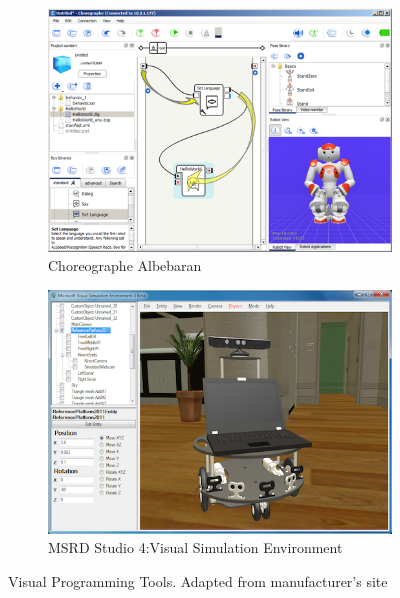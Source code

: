 {\begin{figure}[H]
\centering
\begin{subfigure}[b]{0.5\textwidth}
\includegraphics[width=\textwidth]{assets/helloworld_cho_dlg_05.png}
\caption{Choreographe Albebaran}
\label{fig:choreographe}
\end{subfigure}%
\begin{subfigure}[b]{0.5\textwidth}
\includegraphics[width=\textwidth]{assets/MSRD4_VSE2.png}
\caption{MSRD Studio 4:Visual Simulation Environment}
\label{fig:msrd4_vse}
\end{subfigure}%
\caption[Visual Programming Tools]{Visual Programming Tools. {Adapted from manufacturer's site}}

\end{figure}}
